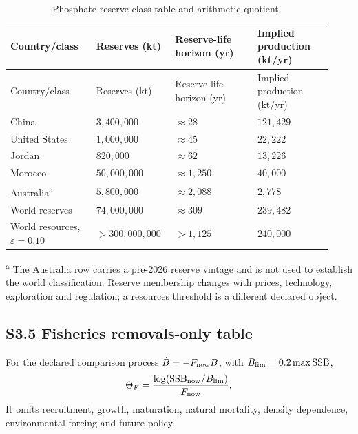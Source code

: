 \documentclass[11pt]{article}
\begin{document}
\begin{longtable}{@{}P{0.25\linewidth}P{0.22\linewidth}P{0.24\linewidth}P{0.22\linewidth}@{}}
\caption{Phosphate reserve-class table and arithmetic quotient.}\label{tab:phosphate}\\
\toprule
Country/class & Reserves (kt) & Reserve-life horizon (yr) & Implied production (kt/yr) \\
\midrule
\endfirsthead
\toprule
Country/class & Reserves (kt) & Reserve-life horizon (yr) & Implied production (kt/yr) \\
\midrule
\endhead
\bottomrule
\endfoot
China & $3{,}400{,}000$ & $\approx28$ & $121{,}429$ \\
United States & $1{,}000{,}000$ & $\approx45$ & $22{,}222$ \\
Jordan & $820{,}000$ & $\approx62$ & $13{,}226$ \\
Morocco & $50{,}000{,}000$ & $\approx1{,}250$ & $40{,}000$ \\
Australia\textsuperscript{a} & $5{,}800{,}000$ & $\approx2{,}088$ & $2{,}778$ \\
World reserves & $74{,}000{,}000$ & $\approx309$ & $239{,}482$ \\
World resources, $\varepsilon=0.10$ & $>300{,}000{,}000$ & $>1{,}125$ & $240{,}000$ \\
\end{longtable}

\textsuperscript{a} The Australia row carries a pre-2026 reserve vintage and is not used to establish the world classification. Reserve membership changes with prices, technology, exploration and regulation; a resources threshold is a different declared object.

\subsection*{S3.5 Fisheries removals-only table}

For the declared comparison process $\dot B=-F_{\rm now}B$, with $B_{\rm lim}=0.2\max\mathrm{SSB}$,
\begin{equation}
\Theta_F=\frac{\log(\mathrm{SSB}_{\rm now}/B_{\rm lim})}{F_{\rm now}}.
\end{equation}
It omits recruitment, growth, maturation, natural mortality, density dependence, environmental forcing and future policy.
\end{document}
